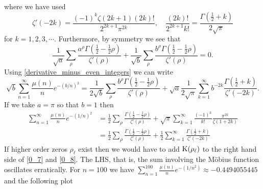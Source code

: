 \documentclass[11pt]{article}
\numberwithin{equation}{section}		 			%
\numberwithin{figure}{section}			 			%
\begin{document}
where we have used 
\[
\zeta '( - 2k) = \frac{{( - 1)^k \zeta (2k + 1)(2k)!}}
{{2^{2k + 1} \pi ^{2k} }},\quad \frac{{(2k)!}}
{{2^{2k + 1} k!}} = \frac{{\Gamma (\tfrac{1}
{2} + k)}}
{{2\sqrt \pi  }}
\]
for $k=1,2,3, \cdots$. Furthermore, by symmetry we see that
\[
\frac{1}
{{\sqrt a }}\sum\limits_\rho  {\frac{{a^\rho  \Gamma (\tfrac{1}
{2} - \tfrac{1}
{2}\rho )}}
{{\zeta '(\rho )}}}  + \frac{1}
{{\sqrt b }}\sum\limits_\rho  {\frac{{b^\rho  \Gamma (\tfrac{1}
{2} - \tfrac{1}
{2}\rho )}}
{{\zeta '(\rho )}}}  = 0.
\]
Using \eqref{derivative_minus_even_integers} we can write
\[
\sqrt b \sum\limits_{n = 1}^\infty  {\frac{{\mu (n)}}
{n}e^{ - (b/n)^2 } }  = \frac{1}
{{2\sqrt b }}\sum\limits_\rho  {\frac{{b^\rho  \Gamma (\tfrac{1}
{2} - \tfrac{1}
{2}\rho )}}
{{\zeta '(\rho )}}}  + \sqrt a \frac{1}
{{2\sqrt \pi  }}\sum\limits_{k = 1}^\infty  {b^{ - 2k} \frac{{\Gamma (\tfrac{1}
{2} + k)}}
{{\zeta '( - 2k)}}}. 
\]
If we take $a=\pi$ so that $b=1$ then
\begin{align} \label{0_7}
  \sum\limits_{n = 1}^\infty  {\frac{{\mu (n)}}
{n}e^{ - (1/n)^2 } } &= \frac{1}
{2}\sum\limits_\rho  {\frac{{\Gamma (\tfrac{1}
{2} - \tfrac{1}
{2}\rho )}}
{{\zeta '(\rho )}}}  + \sqrt \pi  \sum\limits_{k = 1}^\infty  {\frac{{( - 1)^k }}
{{k!}}\frac{{\pi ^{2k} }}
{{\zeta (1 + 2k)}}} \\
  \label{0_8} &= \frac{1}
{2}\sum\limits_\rho  {\frac{{\Gamma (\tfrac{1}
{2} - \tfrac{1}
{2}\rho )}}
{{\zeta '(\rho )}}}  + \frac{1}
{2}\sum\limits_{k = 1}^\infty  {\frac{{\Gamma (\tfrac{1}
{2} + k)}}
{{\zeta '( - 2k)}}}   
\end{align}
If higher order zeros $\rho_\ell$ exist then we would have to add ${\rm K}(\rho _\ell)$ to the right hand side of \eqref{0_7} and \eqref{0_8}. The LHS, that is, the sum involving the M\"{o}bius function oscillates erratically. For $n=100$ we have $\sum\nolimits_{n = 1}^{100} {\tfrac{{\mu (n)}}{n}e^{ - (1/n^2 )} }  \approx  - 0.4494055445$ and the following plot
\end{document}
